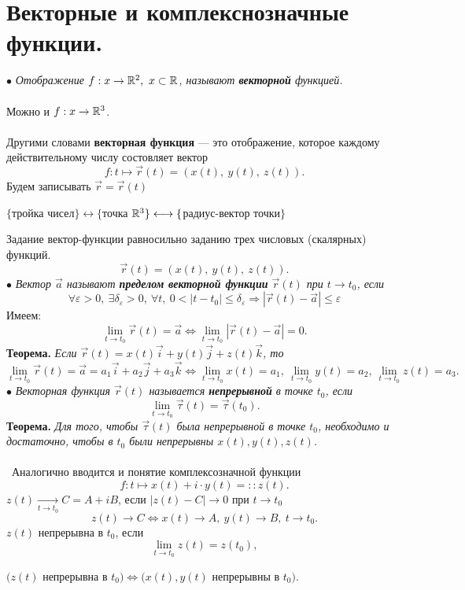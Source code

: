 \section{Векторные и комплекснозначные функции.}
$\bullet$ \textit{Отображение $f:x\to\Rm^2,\ x\subset\Rm$, называют \textbf{векторной} функцией.}\\\\
Можно и $f:x\to\mathbb{R}^3$.\\\\
Другими словами \textbf{векторная функция} --- это отображение, которое каждому действительному числу состовляет вектор$$f:t\mapsto\vec r(t)=(x(t),\ y(t),\ z(t)).$$
Будем записывать $\vec r =\vec r(t)$
\begin{center}$\{$тройка чисел$\}\longleftrightarrow\{$точка $\mathbb{R}^3\}\longleftrightarrow\{$радиус-вектор точки$\}$
\end{center}
Задание вектор-функции равносильно заданию трех числовых (скалярных) функций.$$\vec r(t)=(x(t),\ y(t),\ z(t)).$$
$\bullet$ \textit{Вектор $\vec a$ называют \textbf{пределом векторной функции} $\vec r (t)$ при $t\to t_0$, если$$\forall \varepsilon>0,\:\exists \delta_\varepsilon>0,\: \forall t,\:0<|t-t_0|\leqslant \delta_\varepsilon \Rightarrow |\vec r(t)-\vec a|\leqslant \varepsilon $$}
Имеем:\[\lim_{t \to t_0} \vec r(t)=\vec a\Longleftrightarrow \lim_{t \to t_0}{|\vec r(t)-\vec a|}=0.\]
\textbf{Теорема.}
\textit{Если $\vec r(t)=x(t)\vec i +y(t)\vec j + z(t)\vec k$, то}  \[\lim_{t \to t_0} \vec r(t)=\vec a=a_1 \vec i+a_2 \vec j +a_3 \vec k \Longleftrightarrow \lim_{t \to t_0}x(t)=a_1,\: \lim_{t \to t_0}y(t)=a_2,\:\lim_{t \to t_0}z(t)=a_3.\]
$\bullet$ \textit{Векторная функция $\vec r(t)$ называется \textbf{непрерывной} в точке $t_0$, если} \[\lim_{t \to t_0} \vec \tau(t)=\vec\tau(t_0).\]
\textbf{Теорема.}
\textit{Для того, чтобы $\vec\tau(t)$ была непрерывной в точке $t_0$, необходимо и достаточно, чтобы в $t_0$ были непрерывны $x(t), y(t), z(t)$.}\\\\\
Аналогично вводится и понятие комплексозначной функции $$f:t\mapsto x(t)+i\cdot y(t)=::z(t).$$ $z(t)\underset{t\to t_0}\to C=A+i B$, если $|z(t)-C|\to 0$ при $t\to t_0$
$$z(t)\to C\Longleftrightarrow x(t)\to A,\ y(t)\to B,\ t\to t_0.$$
$z(t)$ непрерывна в $t_0$, если \[\lim_{t \to t_0}z(t)=z(t_0),\]
\begin{center}
	$(z(t)$ непрерывна в $t_0) \Longleftrightarrow(x(t), y(t)$ непрерывны в $t_0).$
\end{center}